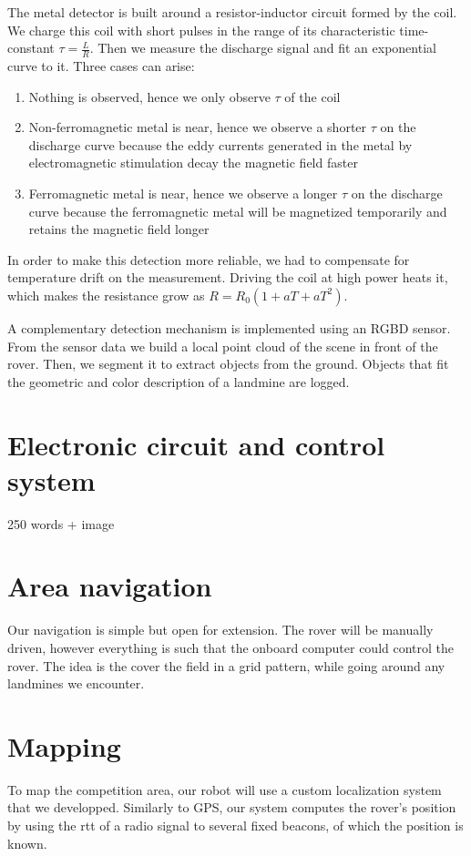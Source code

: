 The metal detector is built around a resistor-inductor circuit formed by the coil.
We charge this coil with short pulses in the range of its characteristic time-constant $\tau = \frac{L}{R}$.
Then we measure the discharge signal and fit an exponential curve to it.
Three cases can arise:
\begin{enumerate}
    \item Nothing is observed, hence we only observe $\tau$ of the coil
    \item Non-ferromagnetic metal is near, hence we observe a shorter $\tau$ on the discharge curve because the eddy currents generated in the metal by electromagnetic stimulation decay the magnetic field faster
    \item Ferromagnetic metal is near, hence we observe a longer $\tau$ on the discharge curve because the ferromagnetic metal will be magnetized temporarily and retains the magnetic field longer
\end{enumerate}
In order to make this detection more reliable, we had to compensate for temperature drift on the measurement.
Driving the coil at high power heats it, which makes the resistance grow as $R = R_0 (1 + a T + a T^2)$.

A complementary detection mechanism is implemented using an RGBD sensor.
From the sensor data we build a local point cloud of the scene in front of the rover.
Then, we segment it to extract objects from the ground.
Objects that fit the geometric and color description of a landmine are logged.

\section{Electronic circuit and control system}
250 words + image

\section{Area navigation}
Our navigation is simple but open for extension.
The rover will be manually driven, however everything is such that the onboard computer could control the rover.
The idea is the cover the field in a grid pattern, while going around any landmines we encounter.

\section{Mapping}

To map the competition area, our robot will use a custom localization system that we developped.
Similarly to GPS, our system computes the rover's position by using the \gls{rtt} of a radio signal to several fixed beacons, of which the position is known.

